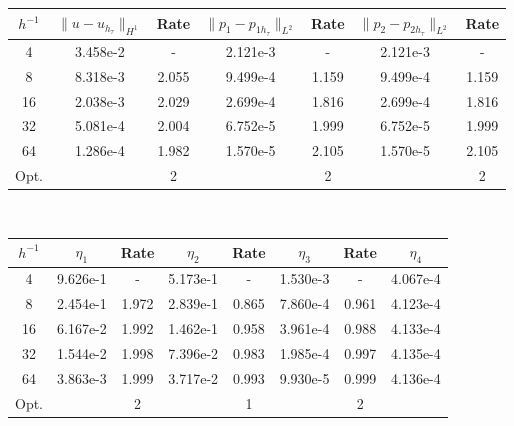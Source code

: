 \begin{center} 
\centering
\begin{tabular}{c|c|c|c|c|c|c}
$h^{-1}$ & $\|u - u_{h_{\tau}}\|_{H^1}$ & Rate & $\|p_1 - p_{1h_{\tau}}\|_{L^2}$ & Rate & $\|p_2 - p_{2h_{\tau}}\|_{L^2}$ & Rate\\\hline
4  & 3.458e-2 & -     & 2.121e-3 & -     & 2.121e-3 & -     \\
8  & 8.318e-3 & 2.055 & 9.499e-4 & 1.159 & 9.499e-4 & 1.159 \\
16 & 2.038e-3 & 2.029 & 2.699e-4 & 1.816 & 2.699e-4 & 1.816 \\
32 & 5.081e-4 & 2.004 & 6.752e-5 & 1.999 & 6.752e-5 & 1.999 \\
64 & 1.286e-4 & 1.982 & 1.570e-5 & 2.105 & 1.570e-5 & 2.105 \\\hline
Opt. & & 2 & & 2 & & 2
\end{tabular}
 \label{tab:bb_default_transfer_space_error}
\end{center}
\mbox{}\\
\begin{center} 
\centering
\begin{tabular}{c|c|c|c|c|c|c|c}
$h^{-1}$ & $\eta_1$ & Rate &  $\eta_2$ & Rate & $\eta_3$ & Rate & $\eta_4$ \\\hline
4  & 9.626e-1 & -     & 5.173e-1 & -     & 1.530e-3 & -     & 4.067e-4 \\
8  & 2.454e-1 & 1.972 & 2.839e-1 & 0.865 & 7.860e-4 & 0.961 & 4.123e-4 \\
16 & 6.167e-2 & 1.992 & 1.462e-1 & 0.958 & 3.961e-4 & 0.988 & 4.133e-4 \\
32 & 1.544e-2 & 1.998 & 7.396e-2 & 0.983 & 1.985e-4 & 0.997 & 4.135e-4 \\
64 & 3.863e-3 & 1.999 & 3.717e-2 & 0.993 & 9.930e-5 & 0.999 & 4.136e-4 \\\hline
Opt. & & 2 & & 1  & & 2 & 
\end{tabular}
 \label{tab:bb_default_transfer_space_est}
\end{center}

\clearpage

